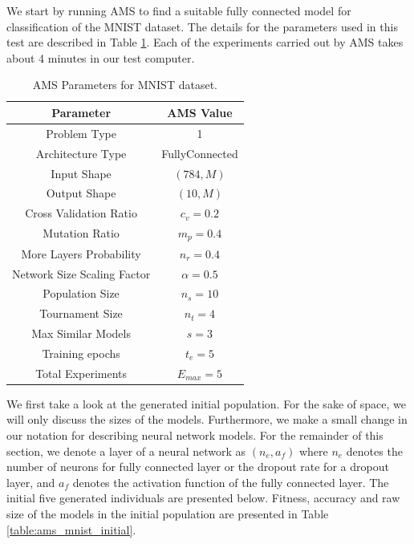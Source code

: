 \documentclass[12pt]{elsart}%
\begin{document}
We start by running AMS to find a suitable fully connected model for classification of the MNIST dataset. The details for the parameters used in this test are described in Table \ref{table:MNIST_params}. Each of the experiments carried out by AMS takes about 4 minutes in our test computer. 

\begin{table}[!htb]
\begin{center}
\caption{AMS Parameters for MNIST dataset.}
\label{table:MNIST_params}
\vspace{12pt}
\begin{tabular}{| c | c |}
\hline
Parameter & AMS Value \\
\hline
Problem Type & 1 \\
Architecture Type & FullyConnected \\
Input Shape & $(784, M)$  \\
Output Shape & $(10, M)$ \\
Cross Validation Ratio & $c_v = 0.2$ \\
Mutation Ratio & $m_p = 0.4$ \\
More Layers Probability & $n_r = 0.4$ \\
Network Size Scaling Factor & $\alpha = 0.5$ \\
Population Size & $n_s = 10$ \\
Tournament Size & $n_t = 4$ \\
Max Similar Models & $s = 3$ \\
Training epochs & $t_e = 5$\\
Total Experiments & $E_{max} = 5$ \\
\hline
\end{tabular}
\end{center}
\end{table}

We first take a look at the generated initial population. For the sake of space, we will only discuss the sizes of the models. Furthermore, we make a small change in our notation for describing neural network models. For the remainder of this section, we denote a layer of a neural network as $(n_e, a_f)$ where $n_e$ denotes the number of neurons for fully connected layer or the dropout rate for a dropout layer, and $a_f$ denotes the activation function of the fully connected layer. The initial five generated individuals are presented below. Fitness, accuracy and raw size of the models in the initial population are presented in Table \ref{table:ams_mnist_initial}.
\end{document}
